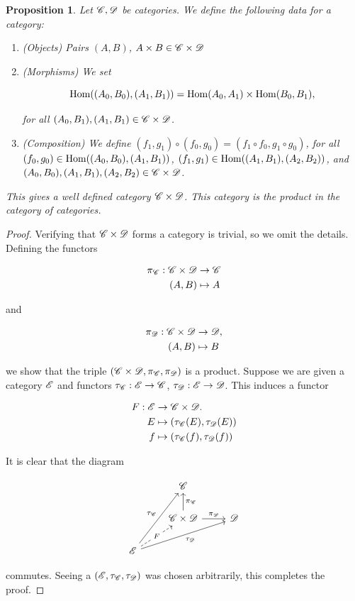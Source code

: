 \documentclass{article}
\newtheorem{proposition}{Proposition}[section]
\theoremstyle{definition}
\numberwithin{figure}{section}
\begin{document}
\begin{proposition} Let $\mathscr{C},\mathscr{D}$ be categories. We define the following data for a category:

\begin{enumerate}
\item (Objects) Pairs $(A,B)$, $A\times B\in \mathscr{C}\times \mathscr{D}$

\item (Morphisms) We set

$$\mathrm{Hom}((A_0,B_0),(A_1,B_1))=\mathrm{Hom}(A_0,A_1)\times \mathrm{Hom}(B_0,B_1),$$

for all $(A_0,B_1), (A_1,B_1)\in \mathscr{C}\times \mathscr{D}$.

\item (Composition) We define $(f_1,g_1)\circ (f_0,g_0)=(f_1\circ f_0, g_1\circ g_0)$, for all $(f_0,g_0)\in \mathrm{Hom}((A_0,B_0),(A_1,B_1))$, $(f_1,g_1)\in \mathrm{Hom}((A_1,B_1),(A_2,B_2))$, and $(A_0,B_0),(A_1,B_1),(A_2,B_2)\in \mathscr{C}\times \mathscr{D}$.
\end{enumerate}

This gives a well defined category $\mathscr{C}\times \mathscr{D}$. This category is the product in the category of categories.
\end{proposition}
\begin{proof} Verifying that $\mathscr{C}\times \mathscr{D}$ forms a category is trivial, so we omit the details. Defining the functors

\begin{align*}
\pi_{\mathscr{C}}:\mathscr{C}\times \mathscr{D}&\to \mathscr{C}\\
(A,B)&\mapsto A
\end{align*}

and

\begin{align*}
\pi_{\mathscr{D}}:\mathscr{C}\times \mathscr{D}&\to \mathscr{D},\\
(A,B)&\mapsto B
\end{align*}

we show that the triple $(\mathscr{C}\times\mathscr{D},\pi_{\mathscr{C}},\pi_{\mathscr{D}})$ is a product. Suppose we are given a category $\mathscr{E}$ and functors $\tau_{\mathscr{C}}:\mathscr{E}\to \mathscr{C}$, $\tau_{\mathscr{D}}:\mathscr{E}\to \mathscr{D}$. This induces a functor

\begin{align*}
F: \mathscr{E}&\to \mathscr{C}\times \mathscr{D}.\\
E&\mapsto (\tau_{\mathscr{C}}(E),\tau_{\mathscr{D}}(E))\\
f&\mapsto (\tau_{\mathscr{C}}(f),\tau_{\mathscr{D}}(f))
\end{align*}

It is clear that the diagram

\[\begin{tikzcd}
	& \Ccat \\
	& {\Ccat\times \Dcat} & \Dcat \\
	\Ecat
	\arrow["F"{description}, dashed, from=3-1, to=2-2]
	\arrow["{\tau_{\Dcat}}"', from=3-1, to=2-3]
	\arrow["{\tau_{\Ccat}}", from=3-1, to=1-2]
	\arrow["{\pi_{\Dcat}}", from=2-2, to=2-3]
	\arrow["{\pi_{\Ccat}}"', from=2-2, to=1-2]
\end{tikzcd}\]

commutes. Seeing a $(\mathscr{E},\tau_{\mathscr{C}},\tau_{\mathscr{D}})$ was chosen arbitrarily, this completes the proof.
\end{proof}
\end{document}
